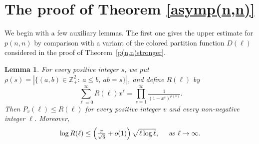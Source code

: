 \documentclass[12pt,a4paper]{amsart}
\numberwithin{equation}{section}
\theoremstyle{plain}
\newtheorem{lm}[thm]{Lemma}
\theoremstyle{definition}
\theoremstyle{remark}
\begin{document}

\section{The proof of Theorem \ref{asymp(n,n)}}
We begin with a few auxiliary lemmas. The first one gives the upper estimate for $p(n,n)$ by comparison with a variant of the colored partition function $D(\ell)$ considered in the proof of Theorem~\ref{p(n,n)stronger}.
\begin{lm}\label{lm: unrestricted rectangles}
For every positive integer $s$, we put $\rho(s)=|\{(a,b)\in\mathbb {Z}_+^2:\ a\le  b,\ ab=s\}|$, and define $R(\ell)$ by
$$
\sum_{\ell=0}^{\infty}R(\ell)x^\ell
=
\prod_{s=1}^{\infty}\tfrac{1}{(1-x^s)^{\rho(s)}}.
$$
Then $P_v(\ell)\le  R(\ell)$ for every positive integer $v$ and every non-negative integer $\ell$. Moreover,
$$
\log R(\ell)
\le 
\left(\tfrac{\pi}{\sqrt6}+o(1)\right)\sqrt{\ell\log \ell},\hspace{0.5cm}\text{as }\ell\to\infty.
$$
\end{lm}
\end{document}
